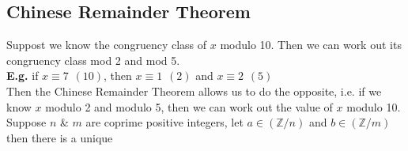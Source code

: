 \documentclass[11pt]{article}
\begin{document}
\subsection{Chinese Remainder Theorem}
Suppost we know the congruency class of $x$ modulo 10. Then we can work out its congruency class mod 2 and mod 5.\\
\textbf{E.g.} if $x \equiv 7 \hspace{5pt}(10)$, then $x \equiv 1 \hspace{5pt} (2) $ and $x \equiv 2 \hspace{5pt} (5) $  \vspace{5pt}\\
Then the Chinese Remainder Theorem allows us to do the opposite, i.e. if we know $x$ modulo 2 and modulo 5, then we can work out the value of $x$ modulo 10.\\
\newpage
Suppose $n$ \& $m$ are coprime positive integers, let $a \in (\mathbb{Z} / n)$ and $b \in (\mathbb{Z}/m)$ then there is a unique
\end{document}
